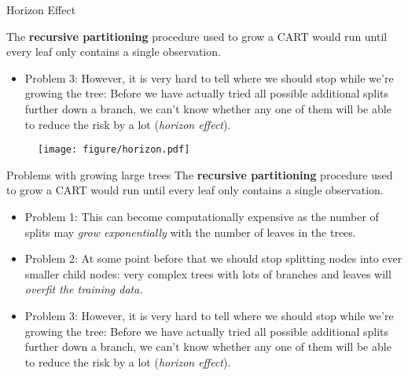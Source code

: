\documentclass[11pt,compress,t,notes=noshow, xcolor=table]{beamer}
\begin{document}
\begin{vbframe}{Horizon Effect}

The \textbf{recursive partitioning} procedure used to grow a CART would run until every leaf only contains a single observation. 
\begin{itemize}
\item Problem 3: However, it is very hard to tell where we should stop while we're growing the tree: Before we have actually tried all possible additional splits further down a branch, we can't know whether any one of them will be able to reduce the risk by a lot (\emph{horizon effect}).
\end{itemize}

\begin{figure}
\centering
\texttt{[image: figure/horizon.pdf]}
\end{figure}


\end{vbframe}

\begin{vbframe}{Problems with growing large trees}
The \textbf{recursive partitioning} procedure used to grow a CART would run until every leaf only contains a single observation. 
\begin{itemize}
\item Problem 1: This can become computationally expensive as the number of splits may \emph{grow exponentially} with the number of leaves in the trees.
\item Problem 2: At some point before that we should stop splitting nodes into ever smaller child nodes: very complex trees with lots of branches and leaves will \emph{overfit the training data.}
\item Problem 3: However, it is very hard to tell where we should stop while we're growing the tree: Before we have actually tried all possible additional splits further down a branch, we can't know whether any one of them will be able to reduce the risk by a lot (\emph{horizon effect}).
\end{itemize}
\end{vbframe}
\end{document}
